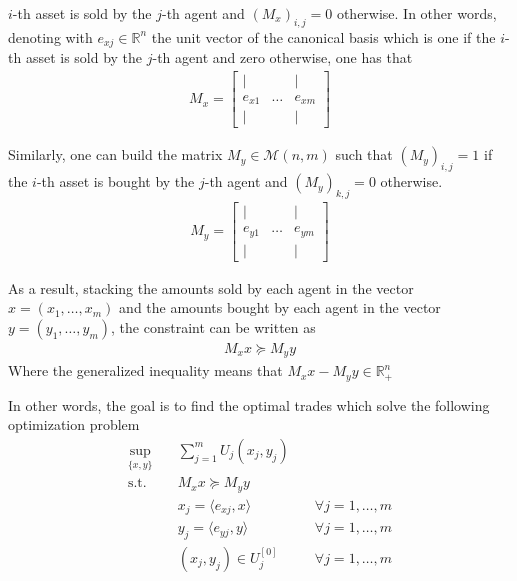 \documentclass{article}
\begin{document}
$i$-th asset is sold by the $j$-th agent and $(M_x)_{i,j}=0$ otherwise. 
In other words, denoting with $e_{xj}\in\mathbb{R}^n$ the unit vector of the canonical basis which is one if the $i$-th asset is sold by the $j$-th agent and zero otherwise, one has that 
\begin{align*}
    M_x = \begin{bmatrix}
        | &  & |\\
        e_{x1} & \dots & e_{xm}\\
        | & & |
    \end{bmatrix}
\end{align*}

Similarly, one can build the matrix $M_y\in\mathcal{M}(n,m)$ such that $(M_y)_{i,j}=1$ if the $i$-th asset is bought by the $j$-th agent and $(M_y)_{k,j}=0$ otherwise. 
\begin{align*}
    M_y = \begin{bmatrix}
        | &  & |\\
        e_{y1} & \dots & e_{ym}\\
        | & & |
        \end{bmatrix}
\end{align*}

As a result, stacking the amounts sold by each agent in the vector $x=(x_1,\dots,x_m)$ and the amounts bought by each agent in the vector $y=(y_1,\dots,y_m)$, the constraint can be written as
\begin{align*}
    M_x x \succeq M_y  y
\end{align*}
Where the generalized inequality means that $M_x x - M_y  y \in\mathbb{R}^n_+$

In other words, the goal is to find the optimal trades which solve the following optimization problem
\begin{align*}
    \sup_{\{x, y\}} \quad& \sum_{j=1}^m U_j(x_{j}, y_{j})\\ 
    \text{s.t.} \quad& M_x x \succeq M_y  y\\
    \quad& x_j = \langle e_{xj}, x \rangle &\quad \forall j=1,\dots,m\\
    \quad& y_j = \langle e_{yj}, y \rangle &\quad \forall j=1,\dots,m\\
    \quad& (x_{j}, y_{j}) \in U^{[0]}_j &\quad \forall j=1,\dots,m
\end{align*}
\end{document}
